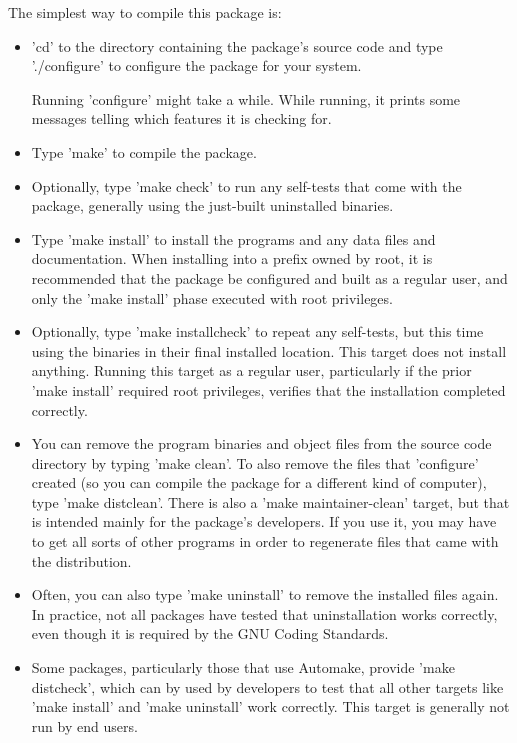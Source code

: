  
  The simplest way to compile this package is:
 \begin{itemize}
 
\item 'cd' to the directory containing the package's source code and type './configure' to configure the package for your system.
 
Running 'configure' might take a while.  While running, it prints
 some messages telling which features it is checking for.
 
\item Type 'make' to compile the package.
 
\item Optionally, type 'make check' to run any self-tests that come with
 the package, generally using the just-built uninstalled binaries.
 
\item Type 'make install' to install the programs and any data files and
 documentation.  When installing into a prefix owned by root, it is
 recommended that the package be configured and built as a regular
 user, and only the 'make install' phase executed with root
 privileges.
 
\item Optionally, type 'make installcheck' to repeat any self-tests, but
 this time using the binaries in their final installed location.
 This target does not install anything.  Running this target as a
 regular user, particularly if the prior 'make install' required
 root privileges, verifies that the installation completed
 correctly.
 
\item You can remove the program binaries and object files from the
 source code directory by typing 'make clean'.  To also remove the
 files that 'configure' created (so you can compile the package for
 a different kind of computer), type 'make distclean'.  There is
 also a 'make maintainer-clean' target, but that is intended mainly
 for the package's developers.  If you use it, you may have to get
 all sorts of other programs in order to regenerate files that came
 with the distribution.
 
 \item Often, you can also type 'make uninstall' to remove the installed
 files again.  In practice, not all packages have tested that
 uninstallation works correctly, even though it is required by the
 GNU Coding Standards.
 
\item Some packages, particularly those that use Automake, provide 'make
 distcheck', which can by used by developers to test that all other
 targets like 'make install' and 'make uninstall' work correctly.
 This target is generally not run by end users.
\end{itemize}


